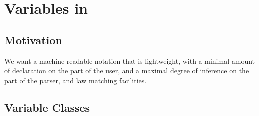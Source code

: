 \section{Variables in }

\subsection{Motivation}

We want a machine-readable notation that is lightweight,
with a minimal amount of declaration on the part of the user,
and a maximal degree of inference on the part of the parser,
and law matching facilities.


\subsection{Variable Classes}

